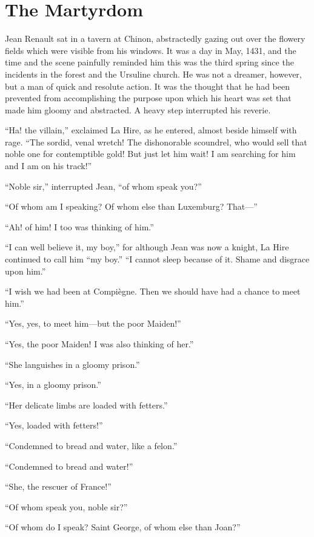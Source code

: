 \chapter{The Martyrdom}

\drop Jean Renault sat in a tavern at Chinon, abstractedly gazing out
over the flowery fields which were visible from his windows. It was a
day in May, 1431, and the time and the scene painfully reminded him this
was the third spring since the incidents in the forest and the Ursuline
church. He was not a dreamer, however, but a man of quick and resolute
action. It was the thought that he had been prevented from accomplishing
the purpose upon which his heart was set that made him gloomy and
abstracted. A heavy step interrupted his reverie.

``Ha! the villain,'' exclaimed La Hire, as he entered, almost beside
himself with rage. ``The sordid, venal wretch! The dishonorable
scoundrel, who would sell that noble one for contemptible gold! But just
let him wait! I am searching for him and I am on his track!''

``Noble sir,'' interrupted Jean, ``of whom speak you?''

``Of whom am I speaking? Of whom else than Luxemburg? That---''

``Ah! of him! I too was thinking of him.''

``I can well believe it, my boy,'' for although Jean was now a knight,
La Hire continued to call him ``my boy.'' ``I cannot sleep because of
it. Shame and disgrace upon him.''

``I wish we had been at Compiègne. Then we should have had a chance to
meet him.''

``Yes, yes, to meet him---but the poor Maiden!''

``Yes, the poor Maiden! I was also thinking of her.''

``She languishes in a gloomy prison.''

``Yes, in a gloomy prison.''

``Her delicate limbs are loaded with fetters.''

``Yes, loaded with fetters!''

``Condemned to bread and water, like a felon.''

``Condemned to bread and water!''

``She, the rescuer of France!''

``Of whom speak you, noble sir?''

``Of whom do I speak? Saint George, of whom else than Joan?''

